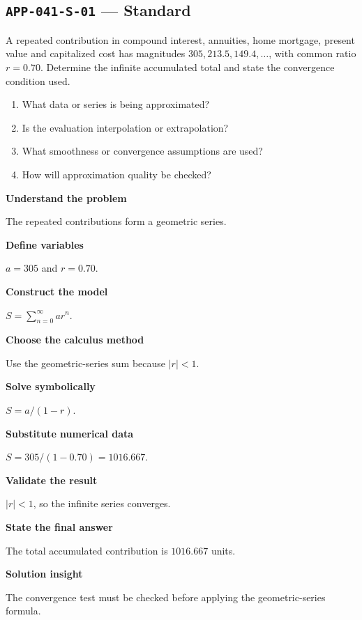 \documentclass[11pt]{book}
\newcommand{\pid}[1]{\texttt{#1}}
\begin{document}
\subsection*{\pid{APP-041-S-01} — Standard}
\begin{problembox}
A repeated contribution in compound interest, annuities, home mortgage, present value and capitalized cost has magnitudes $305, 213.5, 149.4,\ldots$, with common ratio $r=0.70$. Determine the infinite accumulated total and state the convergence condition used.
\end{problembox}
\begin{promptbox}\begin{enumerate}
\item What data or series is being approximated?
\item Is the evaluation interpolation or extrapolation?
\item What smoothness or convergence assumptions are used?
\item How will approximation quality be checked?
\end{enumerate}\end{promptbox}
\begin{solutionbox}
\textbf{Understand the problem}\par The repeated contributions form a geometric series.\par\medskip
\textbf{Define variables}\par $a=305$ and $r=0.70$.\par\medskip
\textbf{Construct the model}\par $S=\sum_{n=0}^{\infty}ar^n$.\par\medskip
\textbf{Choose the calculus method}\par Use the geometric-series sum because $|r|<1$.\par\medskip
\textbf{Solve symbolically}\par $S=a/(1-r)$.\par\medskip
\textbf{Substitute numerical data}\par $S=305/(1-0.70)=1016.667$.\par\medskip
\textbf{Validate the result}\par $|r|<1$, so the infinite series converges.\par\medskip
\textbf{State the final answer}\par The total accumulated contribution is $1016.667$ units.\par\medskip
\textbf{Solution insight}\par The convergence test must be checked before applying the geometric-series formula.\par\medskip
\end{solutionbox}
\end{document}
